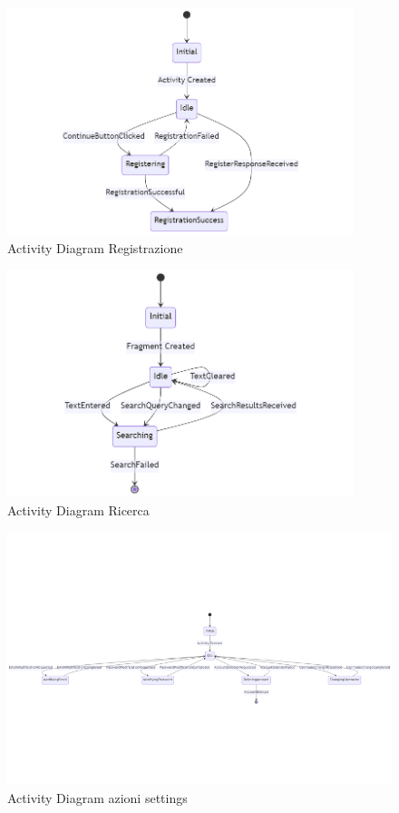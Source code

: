 \documentclass{article}
\begin{document}
			\vspace{0.9cm}
			\begin{figure}[H]
				\centering
				\includegraphics[width=0.9\textwidth]{Immagini/activitydiagramregistration}
				\caption{Activity Diagram Registrazione}
			\end{figure}
			\vspace{0.9cm}
			\begin{figure}[H]
				\centering
				\includegraphics[width=0.9\textwidth]{Immagini/activitydiagramsearch}
				\caption{Activity Diagram Ricerca}
			\end{figure}
			\vspace{0.9cm}
			\begin{figure}[H]
				\centering
				\includegraphics[width=1.0\textwidth]{Immagini/activitydiagramsettings}
				\caption{Activity Diagram azioni settings}
			\end{figure}
			\newpage
			
\end{document}
